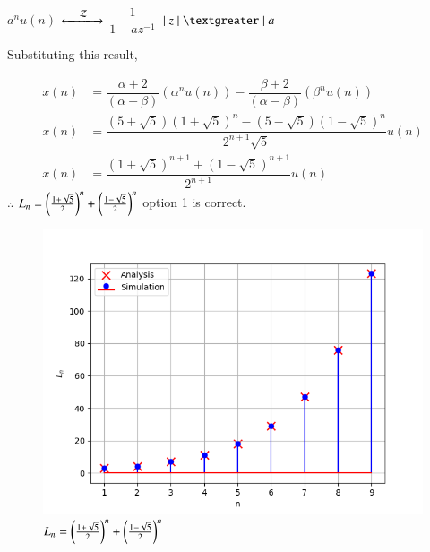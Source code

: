 \documentclass[journal,12pt,twocolumn]{IEEEtran}
\theoremstyle{remark}
\begin{document}
	$a^n u(n)$
	$\xleftarrow[]{\hspace{0.4cm}{\mathcal{Z}}\hspace{0.1cm}}\xrightarrow[]{}$
	$\dfrac{1}{1 - a z^{-1}}$ \hspace{0.2cm} $\lvert \hspace{0.1cm} z \hspace{0.1cm}\rvert \hspace{0.1cm} \textgreater \hspace{0.1cm} \lvert \hspace{0.1cm} a \hspace{0.1cm} \rvert$
	
	\vspace{0.4cm}
	
	Substituting this result,
	
	\vspace{-0.5cm}
	
	\begin{align}
		x(n) &= \dfrac{\alpha+2}{(\alpha - \beta)} (\alpha^n u(n)) - \dfrac{\beta+2}{(\alpha - \beta)} (\beta^n u(n))\\
	    x(n) &= \dfrac{(5+\sqrt{5})(1 + \sqrt{5})^{n} - (5-\sqrt{5})(1 - \sqrt{5})^{n} }{2^{n+1} \sqrt{5}} u(n)\\
    	x(n) &= \dfrac{(1 + \sqrt{5})^{n+1} +(1 - \sqrt{5})^{n+1} }{2^{n+1}} u(n)
    \end{align}
$\therefore$ $L_{n} =\left(\frac{1+\sqrt{5}}{2}\right)^n+\left(\frac{1-\sqrt{5}}{2}\right)^n$
option 1 is correct.
\newpage
\begin{figure}[h]
  \centering
  \includegraphics[width=\columnwidth]{2023/CS/15/figs/fig1.png}
  \caption{$L_{n}=\left(\frac{1+\sqrt{5}}{2}\right)^n+\left(\frac{1-\sqrt{5}}{2}\right)^n$}
\end{figure}
\end{document}
